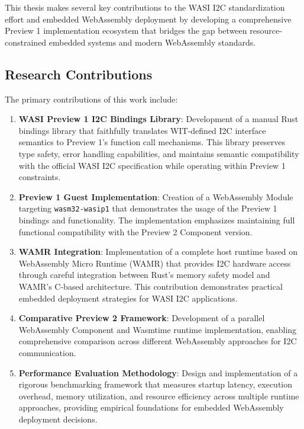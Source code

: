 This thesis makes several key contributions to the WASI I2C standardization effort and embedded WebAssembly deployment by developing a comprehensive Preview 1 implementation ecosystem that bridges the gap between resource-constrained embedded systems and modern WebAssembly standards.

\subsection{Research Contributions}
\label{subsec:research-contributions}

The primary contributions of this work include:

\begin{enumerate}
    \item \textbf{WASI Preview 1 I2C Bindings Library}: Development of a manual Rust bindings library that faithfully translates WIT-defined I2C interface semantics to Preview 1's function call mechanisms. This library preserves type safety, error handling capabilities, and maintains semantic compatibility with the official WASI I2C specification while operating within Preview 1 constraints.

    \item \textbf{Preview 1 Guest Implementation}: Creation of a WebAssembly Module targeting \sloppy\texttt{wasm32-wasip1} that demonstrates the usage of the Preview 1 bindings and functionality. The implementation emphasizes maintaining full functional compatibility with the Preview 2 Component version.
    
    \item \textbf{WAMR Integration}: Implementation of a complete host runtime based on WebAssembly Micro Runtime (WAMR) that provides I2C hardware access through careful integration between Rust's memory safety model and WAMR's C-based architecture. This contribution demonstrates practical embedded deployment strategies for WASI I2C applications.
    
    \item \textbf{Comparative Preview 2 Framework}: Development of a parallel WebAssembly Component and Wasmtime runtime implementation, enabling comprehensive comparison across different WebAssembly approaches for I2C communication.
    
    \item \textbf{Performance Evaluation Methodology}: Design and implementation of a rigorous benchmarking framework that measures startup latency, execution overhead, memory utilization, and resource efficiency across multiple runtime approaches, providing empirical foundations for embedded WebAssembly deployment decisions.
\end{enumerate}

